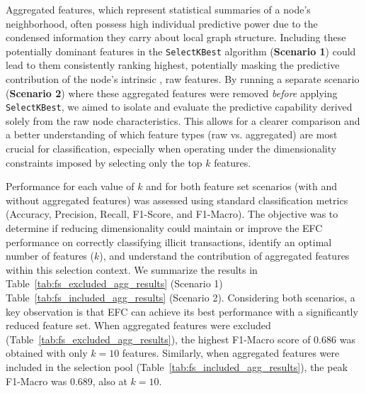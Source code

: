 \documentclass[12pt]{article}
\begin{document}
Aggregated features, which represent statistical summaries of a node's neighborhood, often possess high individual predictive
power due to the condensed information they carry about local graph structure. Including these potentially dominant features
in the \texttt{SelectKBest} algorithm ({\bf Scenario 1}) could lead to them consistently ranking highest, potentially masking
the predictive contribution of the node's intrinsic \cite{weber2019antimoneylaunderingbitcoinexperimenting}, raw features.
By running a separate scenario ({\bf Scenario 2}) where these aggregated features were removed \textit{before} applying
\texttt{SelectKBest}, we aimed to isolate and evaluate the predictive capability derived solely from the raw node characteristics.
This allows for a clearer comparison and a better understanding of which feature types (raw vs. aggregated) are most crucial
for classification, especially when operating under the dimensionality constraints imposed by selecting only the top $k$ features.

Performance for each value of $k$ and for both feature set scenarios (with and without aggregated features) was assessed
using standard classification metrics (Accuracy, Precision, Recall, F1-Score, and F1-Macro). The objective was to
determine if reducing dimensionality could maintain or improve the EFC performance on correctly classifying illicit transactions,
identify an optimal number of features ($k$), and understand the contribution of aggregated features within this selection context.
We summarize the results in Table~\ref{tab:fs_excluded_agg_results} (Scenario 1) Table~\ref{tab:fs_included_agg_results} (Scenario 2).
Considering both scenarios, a key observation is that EFC can achieve its best performance with a significantly reduced
feature set. When aggregated features were excluded (Table~\ref{tab:fs_excluded_agg_results}), the highest F1-Macro score
of 0.686 was obtained with only $k=10$ features. Similarly, when aggregated features were included in the selection pool
(Table~\ref{tab:fs_included_agg_results}), the peak F1-Macro was 0.689, also at $k=10$.
\end{document}
